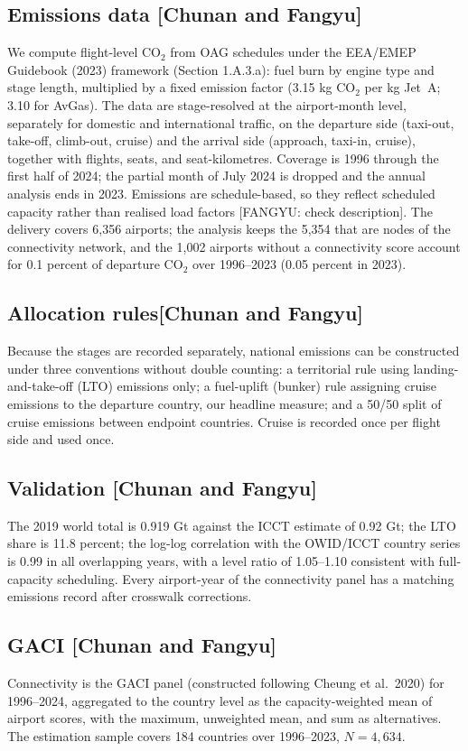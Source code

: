 \documentclass[12pt]{article}
\begin{document}
\subsection*{Emissions data [Chunan and Fangyu]}
We compute flight-level CO$_2$ from OAG schedules under the EEA/EMEP
Guidebook (2023) framework (Section 1.A.3.a): fuel burn by engine type and
stage length, multiplied by a fixed emission factor (3.15 kg CO$_2$ per kg
Jet~A; 3.10 for AvGas). The data are stage-resolved at the airport-month
level, separately for domestic and international traffic, on the departure
side (taxi-out, take-off, climb-out, cruise) and the arrival side
(approach, taxi-in, cruise), together with flights, seats, and
seat-kilometres. Coverage is 1996 through the first half of 2024; the
partial month of July 2024 is dropped and the annual analysis ends in 2023.
Emissions are schedule-based, so they reflect scheduled capacity rather
than realised load factors [FANGYU: check description]. The delivery
covers 6{,}356 airports; the analysis keeps the 5{,}354 that are nodes of
the connectivity network, and the 1{,}002 airports without a connectivity
score account for 0.1 percent of departure CO$_2$ over 1996--2023 (0.05
percent in 2023).

\subsection*{Allocation rules[Chunan and Fangyu]}
Because the stages are recorded separately, national emissions can be
constructed under three conventions without double counting: a territorial
rule using landing-and-take-off (LTO) emissions only; a fuel-uplift
(bunker) rule assigning cruise emissions to the departure country, our
headline measure; and a 50/50 split of cruise emissions between endpoint
countries. Cruise is recorded once per flight side and used once.

\subsection*{Validation [Chunan and Fangyu]}
The 2019 world total is 0.919 Gt against the ICCT estimate of 0.92 Gt; the
LTO share is 11.8 percent; the log-log correlation with the OWID/ICCT
country series is 0.99 in all overlapping years, with a level ratio of
1.05--1.10 consistent with full-capacity scheduling. Every airport-year of
the connectivity panel has a matching emissions record after crosswalk
corrections.

\subsection*{GACI [Chunan and Fangyu]}
Connectivity is the GACI panel (constructed following Cheung et al.\ 2020)
for 1996--2024, aggregated to the country level as the capacity-weighted
mean of airport scores, with the maximum, unweighted mean, and sum as
alternatives. The estimation sample covers 184 countries over 1996--2023,
$N = 4{,}634$.
\end{document}
